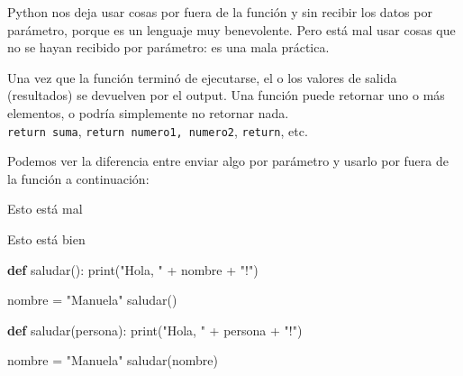 \documentclass[
  letterpaper,
  DIV=11,
  numbers=noendperiod]{scrreprt}
\newenvironment{Shaded}{\begin{snugshade}}{\end{snugshade}}
\newcommand{\BuiltInTok}[1]{\textcolor[rgb]{0.00,0.23,0.31}{#1}}
\newcommand{\KeywordTok}[1]{\textcolor[rgb]{0.00,0.23,0.31}{\textbf{#1}}}
\newcommand{\NormalTok}[1]{\textcolor[rgb]{0.00,0.23,0.31}{#1}}
\newcommand{\OperatorTok}[1]{\textcolor[rgb]{0.37,0.37,0.37}{#1}}
\newcommand{\StringTok}[1]{\textcolor[rgb]{0.13,0.47,0.30}{#1}}
\begin{document}
\begin{tcolorbox}[enhanced jigsaw, opacitybacktitle=0.6, toptitle=1mm, toprule=.15mm, arc=.35mm, breakable, bottomrule=.15mm, opacityback=0, leftrule=.75mm, rightrule=.15mm, title=\textcolor{quarto-callout-warning-color}{\faExclamationTriangle}\hspace{0.5em}{¡Cuidado!}, left=2mm, bottomtitle=1mm, colframe=quarto-callout-warning-color-frame, colback=white, titlerule=0mm, coltitle=black, colbacktitle=quarto-callout-warning-color!10!white]

Python nos deja usar cosas por fuera de la función y sin recibir los
datos por parámetro, porque es un lenguaje muy benevolente. Pero está
mal usar cosas que no se hayan recibido por parámetro: es una mala
práctica.

\end{tcolorbox}

Una vez que la función terminó de ejecutarse, el o los valores de salida
(resultados) se devuelven por el output. Una función puede retornar uno
o más elementos, o podría simplemente no retornar nada.\\
\texttt{return\ suma}, \texttt{return\ numero1,\ numero2},
\texttt{return}, etc.

Podemos ver la diferencia entre enviar algo por parámetro y usarlo por
fuera de la función a continuación:

Esto está mal

Esto está bien

\begin{Shaded}
\begin{Highlighting}[]
\KeywordTok{def}\NormalTok{ saludar():}
  \BuiltInTok{print}\NormalTok{(}\StringTok{"Hola, "} \OperatorTok{+}\NormalTok{ nombre }\OperatorTok{+} \StringTok{"!"}\NormalTok{)}

\NormalTok{nombre }\OperatorTok{=} \StringTok{"Manuela"}
\NormalTok{saludar()}
\end{Highlighting}
\end{Shaded}

\begin{Shaded}
\begin{Highlighting}[]
\KeywordTok{def}\NormalTok{ saludar(persona):}
  \BuiltInTok{print}\NormalTok{(}\StringTok{"Hola, "} \OperatorTok{+}\NormalTok{ persona }\OperatorTok{+} \StringTok{"!"}\NormalTok{)}

\NormalTok{nombre }\OperatorTok{=} \StringTok{"Manuela"}
\NormalTok{saludar(nombre)}
\end{Highlighting}
\end{Shaded}
\end{document}

